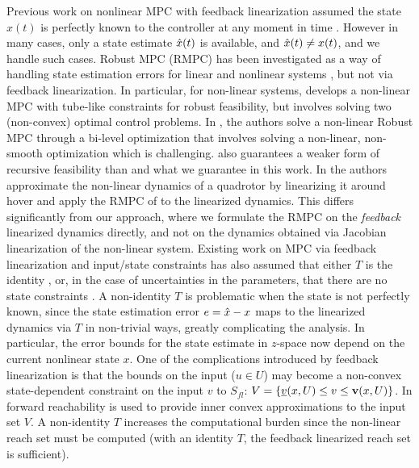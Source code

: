 Previous work on nonlinear MPC with feedback linearization assumed the state $x(t)$ is perfectly known to the controller at any moment in time \cite{SimonLG13_MPC}.
However in many cases, only a state estimate $\hat{x}(t)$ is available, and $\hat{x}(t) \neq x(t)$, and we handle such cases.
Robust MPC (RMPC) has been investigated as a way of handling state estimation errors for linear \cite{RichardsH05_RMPC} and nonlinear systems \cite{tube,relaxed}, but not via feedback linearization. 
In particular, for non-linear systems, \cite{tube} develops a non-linear MPC with tube-like constraints for robust feasibility, but involves solving two (non-convex) optimal control problems. 
In \cite{relaxed}, the authors solve a non-linear Robust MPC through a bi-level optimization that involves solving a non-linear, non-smooth optimization which is challenging. 
\cite{relaxed} also guarantees a weaker form of recursive feasibility than \cite{RichardsH05_RMPC} and what we guarantee in this work. 
In \cite{Zhao20141335} the authors approximate the non-linear dynamics of a quadrotor by linearizing it around hover and apply the RMPC of \cite{RichardsH05_RMPC} to the linearized dynamics.
This differs significantly from our approach, where we formulate the RMPC on the \emph{feedback} linearized dynamics directly, and not on the dynamics obtained via Jacobian linearization of the non-linear system.
Existing work on MPC via feedback linearization and input/state constraints has also assumed that either $T$ is the identity \cite{SimonLG13_MPC}, 
or, in the case of uncertainties in the parameters, that there are no state constraints \cite{parameter}.
A non-identity $T$ is problematic when the state is not perfectly known, since the state estimation error $e = \hat{x}-x$ maps to the linearized dynamics via $T$ in non-trivial ways, greatly complicating the analysis.
In particular, the error bounds for the state estimate in $z$-space now depend on the current nonlinear state $x$.
One of the complications introduced by feedback linearization is that the bounds on the input ($u \in U$) may become a non-convex state-dependent constraint on the input $v$ to $S_{fl}$: 
$V = \{\underline{v}(x, U) \leq v \leq \mathbf{v}(x,U)\}$.
In \cite{SimonLG13_MPC} forward reachability is used to provide inner convex approximations to the input set $V$.
A non-identity $T$ increases the computational burden since the non-linear reach set must be computed (with an identity $T$, the feedback linearized reach set is sufficient).

